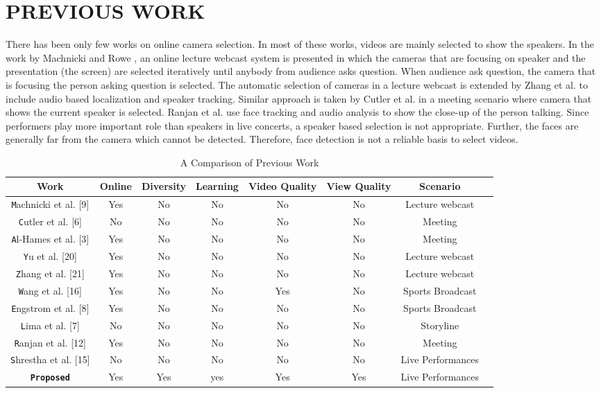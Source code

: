 \documentclass{sig-alternate}
\begin{document}
\section{PREVIOUS WORK}
There has been only few works on online camera selection. In most of these works, videos are mainly selected to show the speakers. In the work by Machnicki and Rowe \cite{9}, an online lecture webcast system is presented in which the cameras that are focusing on speaker and the presentation (the screen) are selected iteratively until anybody from audience asks question. When audience ask question, the camera that is focusing the person asking question is selected. The automatic selection of cameras in a lecture webcast is extended by Zhang et al. \cite{21} to include audio based localization and speaker tracking. Similar approach is taken by Cutler et al. \cite{6} in a meeting scenario where camera that shows the current speaker is selected. Ranjan et al. \cite{12} use face tracking and audio analysis to show the close-up of the person talking. Since performers play more important role than speakers in live concerts, a speaker based selection is not appropriate. Further, the faces are generally far from the camera which cannot be detected. Therefore, face detection is not a reliable basis to select videos.

\begin{table}
\centering
\caption{A Comparison of Previous Work}
\begin{tabular}{|c|c|c|c|c|c|c|c|} \hline
Work&Online&Diversity&Learning&Video Quality&View Quality&Scenario\\ \hline
\texttt Machnicki et al. [9]&Yes&No&No&No&No&Lecture webcast  \\ \hline 
\texttt Cutler et al. [6]&No&No&No&No&No&Meeting  \\ \hline 
\texttt Al-Hames et al. [3]&Yes&No&No&No&No&Meeting  \\ \hline 
\texttt Yu et al. [20]&Yes&No&No&No&No&Lecture webcast  \\ \hline 
\texttt Zhang et al. [21]&Yes&No&No&No&No&Lecture webcast  \\ \hline 
\texttt Wang et al. [16]&Yes&No&No&Yes&No&Sports Broadcast  \\ \hline 
\texttt Engstrom et al. [8]&Yes&No&No&No&No&Sports Broadcast  \\ \hline 
\texttt Lima et al. [7]&No&No&No&No&No&Storyline  \\ \hline 
\texttt Ranjan et al. [12]&Yes&No&No&No&No&Meeting  \\ \hline 
\texttt Shrestha et al. [15]&No&No&No&No&No&Live Performances  \\ \hline 
\texttt \textbf{Proposed}&Yes&Yes&yes&Yes&Yes&Live Performances\\ \hline
\end{tabular}
\end{table}
\end{document}

